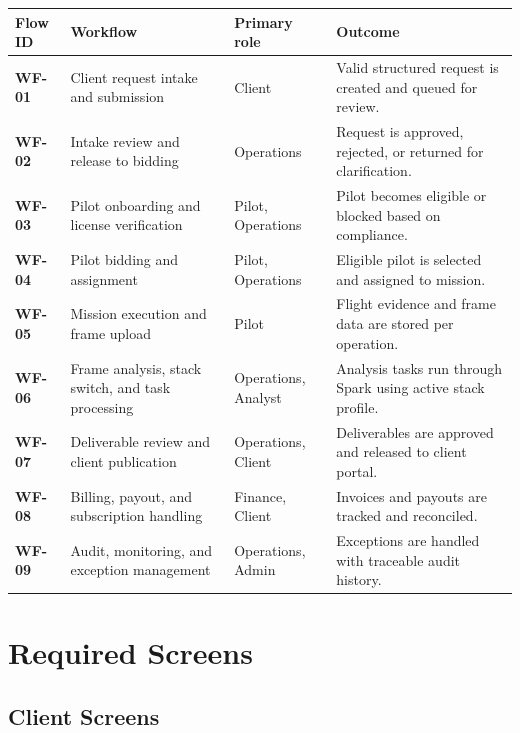 \documentclass[11pt,a4paper]{article}
\begin{document}
\begin{longtable}{>{\bfseries}p{}p{}p{}p{}}
\toprule
Flow ID & Workflow & Primary role & Outcome \\
\midrule
WF-01 & Client request intake and submission & Client & Valid structured request is created and queued for review. \\
WF-02 & Intake review and release to bidding & Operations & Request is approved, rejected, or returned for clarification. \\
WF-03 & Pilot onboarding and license verification & Pilot, Operations & Pilot becomes eligible or blocked based on compliance. \\
WF-04 & Pilot bidding and assignment & Pilot, Operations & Eligible pilot is selected and assigned to mission. \\
WF-05 & Mission execution and frame upload & Pilot & Flight evidence and frame data are stored per operation. \\
WF-06 & Frame analysis, stack switch, and task processing & Operations, Analyst & Analysis tasks run through Spark using active stack profile. \\
WF-07 & Deliverable review and client publication & Operations, Client & Deliverables are approved and released to client portal. \\
WF-08 & Billing, payout, and subscription handling & Finance, Client & Invoices and payouts are tracked and reconciled. \\
WF-09 & Audit, monitoring, and exception management & Operations, Admin & Exceptions are handled with traceable audit history. \\
\bottomrule
\end{longtable}

\section{Required Screens}

\subsection{Client Screens}
\end{document}
